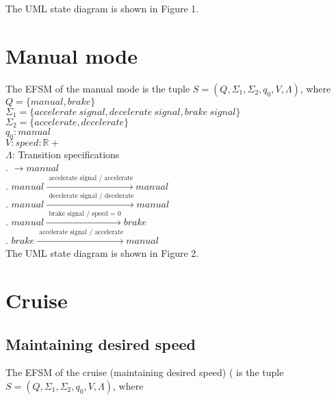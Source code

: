 \documentclass[12pt]{article}
\begin{document}
\begin{spacing}{1.5}
\noindent The UML state diagram is shown in Figure 1.

\newpage

\section{Manual mode}

\noindent The EFSM of the manual mode is the tuple $S = (Q, \Sigma_1, \Sigma_2, q_0, V, \Lambda)$, where\\

\noindent $Q = \{manual, brake\}$\\
\noindent $\Sigma_1 = \{accelerate~signal, decelerate~signal, brake~signal\}$\\
\noindent $\Sigma_2 = \{accelerate, decelerate\}$\\
\noindent $q_0: manual$\\
\noindent $V: speed: \mathbb{R+} $\\
\noindent $\Lambda$: Transition specifications\\
. $\rightarrow manual$\\
. $manual \xrightarrow {\text { accelerate signal / accelerate}} manual$\\
. $manual \xrightarrow {\text { decelerate signal / decelerate}} manual$\\
. $manual \xrightarrow {\text { brake signal / speed = 0}} brake$\\
. $brake \xrightarrow {\text { accelerate signal / accelerate}} manual$\\


\noindent The UML state diagram is shown in Figure 2.

\newpage
\section{Cruise}
\subsection{Maintaining desired speed}

\noindent The EFSM of the cruise (maintaining desired speed) ( is the tuple $S = (Q, \Sigma_1, \Sigma_2, q_0, V, \Lambda)$, where\\


\end{spacing}
\end{document}
